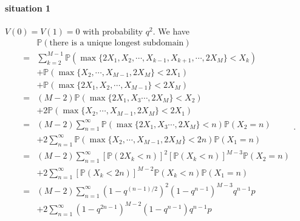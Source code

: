 \documentclass[a4paper,11pt]{article}
\begin{document}
\begin{appendices}
\paragraph*{situation 1}
$V(0) = V(1) = 0$ with probability $q^2$. We have
\begin{equation*}
\begin{split}
  & \mathbb{P}(\text{there is a unique longest subdomain}) \\
= & \sum_{k=2}^{M-1} \mathbb{P}(\max\{2 X_1, X_2, \cdots, X_{k-1}, X_{k+1}, \cdots, 2 X_{M}\} < X_k) \\
& + \mathbb{P}(\max\{X_2, \cdots, X_{M-1}, 2 X_M\} < 2 X_1) \\
& + \mathbb{P}(\max\{2 X_1, X_2, \cdots, X_{M-1}\} < 2 X_M) \\
= & (M-2) \mathbb{P}(\max\{2 X_1, X_3 \cdots, 2 X_{M}\} < X_2) \\
& + 2 \mathbb{P}(\max\{X_2, \cdots, X_{M-1}, 2 X_M\} < 2 X_1) \\
= & (M-2) \sum_{n=1}^{\infty} \mathbb{P}(\max\{2 X_1, X_3 \cdots, 2 X_{M}\} < n) \mathbb{P}(X_2 = n) \\
& + 2 \sum_{n=1}^{\infty} \mathbb{P}(\max\{X_2, \cdots, X_{M-1}, 2 X_M\} < 2 n) \mathbb{P}(X_1 = n) \\
= & (M-2) \sum_{n=1}^{\infty} [\mathbb{P}(2 X_k < n)]^2 [\mathbb{P}(X_k < n)]^{M-3} \mathbb{P}(X_2 = n) \\
& + 2 \sum_{n=1}^{\infty} [\mathbb{P}(X_k < 2 n)]^{M-2} \mathbb{P}(X_k < n) \mathbb{P}(X_1 = n) \\
= & (M-2) \sum_{n=1}^{\infty} (1 - q^{(n-1)/2})^2 (1 - q^{n-1})^{M-3} q^{n-1} p \\
& + 2 \sum_{n=1}^{\infty} (1 - q^{2n-1})^{M-2} (1 - q^{n-1}) q^{n-1} p
\end{split}.
\end{equation*}


\end{appendices}
\end{document}
